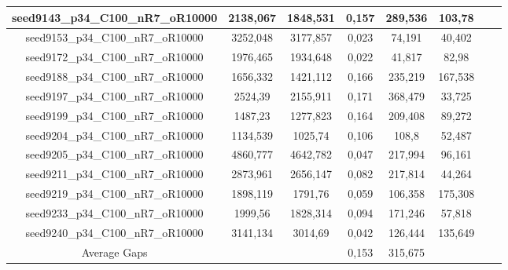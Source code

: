 \documentclass[a4paper]{article}
\begin{document}
\begin{center}
\begin{longtable}{cccccccc}
\hline
seed9143\_p34\_C100\_nR7\_oR10000 & 2138,067 & 1848,531 & 0,157 & 289,536 & 103,78\\
\hline
seed9153\_p34\_C100\_nR7\_oR10000 & 3252,048 & 3177,857 & 0,023 & 74,191 & 40,402\\
\hline
seed9172\_p34\_C100\_nR7\_oR10000 & 1976,465 & 1934,648 & 0,022 & 41,817 & 82,98\\
\hline
seed9188\_p34\_C100\_nR7\_oR10000 & 1656,332 & 1421,112 & 0,166 & 235,219 & 167,538\\
\hline
seed9197\_p34\_C100\_nR7\_oR10000 & 2524,39 & 2155,911 & 0,171 & 368,479 & 33,725\\
\hline
seed9199\_p34\_C100\_nR7\_oR10000 & 1487,23 & 1277,823 & 0,164 & 209,408 & 89,272\\
\hline
seed9204\_p34\_C100\_nR7\_oR10000 & 1134,539 & 1025,74 & 0,106 & 108,8 & 52,487\\
\hline
seed9205\_p34\_C100\_nR7\_oR10000 & 4860,777 & 4642,782 & 0,047 & 217,994 & 96,161\\
\hline
seed9211\_p34\_C100\_nR7\_oR10000 & 2873,961 & 2656,147 & 0,082 & 217,814 & 44,264\\
\hline
seed9219\_p34\_C100\_nR7\_oR10000 & 1898,119 & 1791,76 & 0,059 & 106,358 & 175,308\\
\hline
seed9233\_p34\_C100\_nR7\_oR10000 & 1999,56 & 1828,314 & 0,094 & 171,246 & 57,818\\
\hline
seed9240\_p34\_C100\_nR7\_oR10000 & 3141,134 & 3014,69 & 0,042 & 126,444 & 135,649\\
\hline
\hline
Average Gaps & & & 0,153 & 315,675 &  \\
\hline
\hline
\end{longtable}
\end{center}
\end{document}
